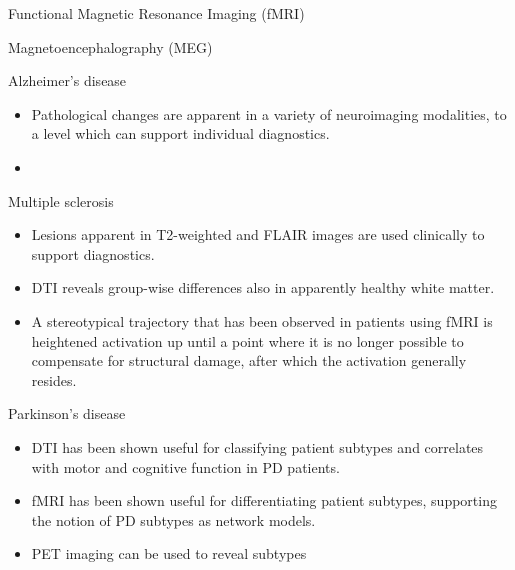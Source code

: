 \documentclass[10pt]{beamer}
\begin{document}
    \begin{frame}{Functional Magnetic Resonance Imaging (fMRI)}
    \end{frame}
    \begin{frame}{Magnetoencephalography (MEG)}
    \end{frame}
    \begin{frame}{Alzheimer's disease}
        \centering
        \begin{itemize}
            \item Pathological changes are apparent in a variety of neuroimaging modalities, to a level which can support individual diagnostics.
            \item
        \end{itemize}
    \end{frame}
    \begin{frame}{Multiple sclerosis}
        \begin{itemize}
            \item Lesions apparent in T2-weighted and FLAIR images are used clinically to support diagnostics.
            \item DTI reveals group-wise differences also in apparently healthy white matter.
            \item A stereotypical trajectory that has been observed in patients using fMRI is heightened activation up until a point where it is no longer possible to compensate for structural damage, after which the activation generally resides.
        \end{itemize}
    \end{frame}
    \begin{frame}{Parkinson's disease}
        \begin{itemize}
            \item DTI has been shown useful for classifying patient subtypes and correlates with motor and cognitive function in PD patients.
            \item fMRI has been shown useful for differentiating patient subtypes, supporting the notion of PD subtypes as network models.
            \item PET imaging can be used to reveal subtypes
        \end{itemize}
    \end{frame}
\end{document}
